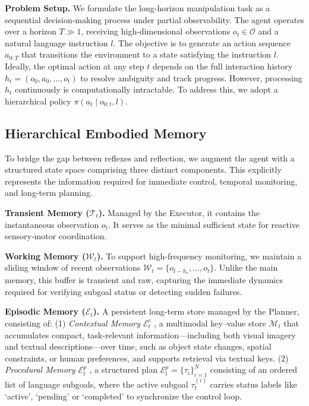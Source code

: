 \textbf{Problem Setup.} 
We formulate the long-horizon manipulation task as a sequential decision-making process under partial observability. The agent operates over a horizon $T \gg 1$, receiving high-dimensional observations $o_t \in \mathcal{O}$ and a natural language instruction $l$. The objective is to generate an action sequence $a_{0:T}$ that transitions the environment to a state satisfying the instruction $l$. Ideally, the optimal action at any step $t$ depends on the full interaction history $h_t = (o_0, a_0, \dots, o_t)$ to resolve ambiguity and track progress. However, processing $h_t$ continuously is computationally intractable. To address this, we adopt a hierarchical policy $\pi(a_t \mid o_{0:t}, l)$.

\subsection{Hierarchical Embodied Memory}
To bridge the gap between reflexes and reflection, we augment the agent with a structured state space comprising three distinct components. This explicitly represents the information required for immediate control, temporal monitoring, and long-term planning.

\textbf{Transient Memory ($\mathcal{T}_t$).} Managed by the Executor, it contains the instantaneous observation $o_t$. It serves as the minimal sufficient state for reactive sensory-motor coordination.

\textbf{Working Memory ($\mathcal{W}_t$).} 
To support high-frequency monitoring, we maintain a sliding window of recent observations $\mathcal{W}_t = \{o_{t-h_s}, \dots, o_t\}$. Unlike the main memory, this buffer is transient and raw, capturing the immediate dynamics required for verifying subgoal status or detecting sudden failures.

\textbf{Episodic Memory ($\mathcal{E}_t$).} A persistent long-term store managed by the Planner, consisting of: 
(1) \textit{Contextual Memory $\mathcal{E}_t^{c}$} 
, a multimodal key--value store $\mathcal{M}_t$ that accumulates compact, task-relevant information—including both visual imagery and textual descriptions—over time, such as object state changes, spatial constraints, or human preferences, and supports retrieval via textual keys.
(2) \textit{Procedural Memory $\mathcal{E}_t^{p}$} 
, a structured plan $\mathcal{E}_t^{p} = \{\tau_i\}_{i=1}^{N}$ consisting of an ordered list of language subgoals, where the active subgoal $\tau_t^{(i)}$ carries status labels like `active', `pending' or `completed' to synchronize the control loop.


